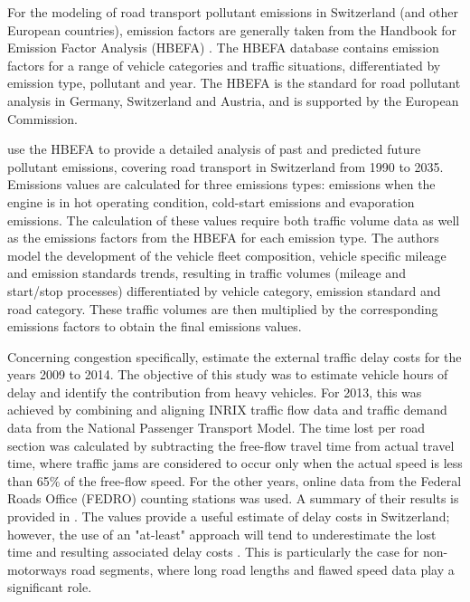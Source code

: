 For the modeling of road transport pollutant emissions in Switzerland (and other European countries), emission factors are generally taken from the Handbook for Emission Factor Analysis (HBEFA) \citep{maibach2008handbook}.
The HBEFA database contains emission factors for a range of vehicle categories and traffic situations, differentiated by emission type, pollutant and year.
The HBEFA is the standard for road pollutant analysis in Germany, Switzerland and Austria, and is supported by the European Commission.

\citet{foen2010pollutants} use the HBEFA to provide a detailed analysis of past and predicted future pollutant emissions, covering road transport in Switzerland from 1990 to 2035.
Emissions values are calculated for three emissions types: emissions when the engine is in hot operating condition, cold-start emissions and evaporation emissions.
The calculation of these values require both traffic volume data as well as the emissions factors from the HBEFA for each emission type.
The authors model the development of the vehicle fleet composition, vehicle specific mileage and emission standards trends, resulting in traffic volumes (mileage and start/stop processes) differentiated by vehicle category, emission standard and road category.
These traffic volumes are then multiplied by the corresponding emissions factors to obtain the final emissions values.

Concerning congestion specifically, \citet{mkinfras2016staukosten} estimate the external traffic delay costs for the years 2009 to 2014.
The objective of this study was to estimate vehicle hours of delay and identify the contribution from heavy vehicles.
For 2013, this was achieved by combining and aligning INRIX traffic flow data and traffic demand data from the National Passenger Transport Model.
The time lost per road section was calculated by subtracting the free-flow travel time from actual travel time, where traffic jams are considered to occur only when the actual speed is less than 65\% of the free-flow speed.
For the other years, online data from the Federal Roads Office (FEDRO) counting stations was used.
A summary of their results is provided in .
The values provide a useful estimate of delay costs in Switzerland; however, the use of an "at-least" approach will tend to underestimate the lost time and resulting associated delay costs \citep{mkinfras2016staukosten}.
This is particularly the case for non-motorways road segments, where long road lengths and flawed speed data play a significant role.

